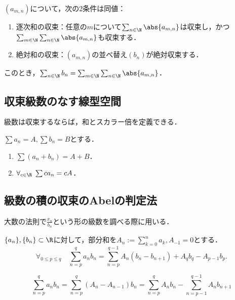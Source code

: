 \documentclass[uplatex, dvipdfmx]{jsreport}
\begin{document}
\begin{theorem}
    $(a_{m,n})$について，次の2条件は同値：
    \begin{enumerate}
        \item 逐次和の収束：任意の$m$について$\sum_{n\in\N}\abs{a_{m,n}}$は収束し，かつ$\sum_{m\in\N}\sum_{n\in\N}\abs{a_{m,n}}$も収束する．
        \item 絶対和の収束：$(a_{m,n})$の並べ替え$(b_n)$が絶対収束する．
    \end{enumerate}
    このとき，$\sum_{n\in\N}b_n=\sum_{m\in\N}\sum_{n\in\N}\abs{a_{m,n}}$．
\end{theorem}


\subsection{収束級数のなす線型空間}

\begin{tcolorbox}[colframe=ForestGreen, colback=ForestGreen!10!white,breakable,colbacktitle=ForestGreen!40!white,coltitle=black,fonttitle=\bfseries\sffamily,
title=]
    級数は収束するならば，和とスカラー倍を定義できる．
\end{tcolorbox}

\begin{theorem}
    $\sum a_n=A,\sum b_n=B$とする．
    \begin{enumerate}
        \item $\sum(a_n+b_n)=A+B$．
        \item $\forall_{c\in\R}\;\sum ca_n=cA$．
    \end{enumerate}
\end{theorem}

\subsection{級数の積の収束のAbelの判定法}

\begin{tcolorbox}[colframe=ForestGreen, colback=ForestGreen!10!white,breakable,colbacktitle=ForestGreen!40!white,coltitle=black,fonttitle=\bfseries\sffamily,
title=]
    大数の法則で$\frac{x_n}{b_n}$という形の級数を調べる際に用いる．
\end{tcolorbox}

\begin{lemma}[Cauchyの部分和公式]
    $\{a_n\},\{b_n\}\subset\R$に対して，部分和を$A_n:=\sum_{k=0}^na_k,A_{-1}=0$とする．
    \[\forall_{0\le p\le q}\quad\sum^q_{n=p}a_nb_n=\sum^{q-1}_{n=p}A_n(b_n-b_{n+1})+A_qb_q-A_{p-1}b_p.\]
\end{lemma}
\begin{Proof}
    \[\sum^q_{n=p}a_nb_n=\sum^q_{n=p}(A_n-A_{n-1})b_n=\sum^q_{n=p}A_nb_n-\sum^{q-1}_{n=p-1}A_nb_{n+1}\]
\end{Proof}
\end{document}
